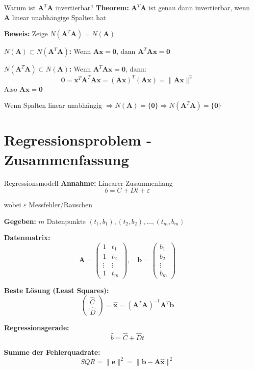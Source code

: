 \documentclass[a4paper, fontsize=7pt]{scrartcl}
\begin{document}
\begin{subbox}{Warum ist $\mathbf{A}^T\mathbf{A}$ invertierbar?}
\textbf{Theorem:} $\mathbf{A}^T\mathbf{A}$ ist genau dann invertierbar, wenn $\mathbf{A}$ linear unabhängige Spalten hat

\textbf{Beweis:} Zeige $N(\mathbf{A}^T\mathbf{A}) = N(\mathbf{A})$

\textbf{$N(\mathbf{A}) \subset N(\mathbf{A}^T\mathbf{A})$:}
Wenn $\mathbf{Ax} = \mathbf{0}$, dann $\mathbf{A}^T\mathbf{Ax} = \mathbf{0}$

\textbf{$N(\mathbf{A}^T\mathbf{A}) \subset N(\mathbf{A})$:}
Wenn $\mathbf{A}^T\mathbf{Ax} = \mathbf{0}$, dann:
$$\mathbf{0} = \mathbf{x}^T\mathbf{A}^T\mathbf{Ax} = (\mathbf{Ax})^T(\mathbf{Ax}) = \|\mathbf{Ax}\|^2$$
Also $\mathbf{Ax} = \mathbf{0}$

Wenn Spalten linear unabhängig $\Rightarrow N(\mathbf{A}) = \{\mathbf{0}\} \Rightarrow N(\mathbf{A}^T\mathbf{A}) = \{\mathbf{0}\}$
\end{subbox}

\section{Regressionsproblem - Zusammenfassung}

\begin{mainbox}{Regressionsmodell}
\textbf{Annahme:} Linearer Zusammenhang
$$b = C + Dt + \varepsilon$$

wobei $\varepsilon$ Messfehler/Rauschen

\textbf{Gegeben:} $m$ Datenpunkte $(t_1, b_1), (t_2, b_2), \ldots, (t_m, b_m)$

\textbf{Datenmatrix:}
$$\mathbf{A} = \begin{pmatrix} 1 & t_1 \\ 1 & t_2 \\ \vdots & \vdots \\ 1 & t_m \end{pmatrix}, \quad \mathbf{b} = \begin{pmatrix} b_1 \\ b_2 \\ \vdots \\ b_m \end{pmatrix}$$

\textbf{Beste Lösung (Least Squares):}
$$\begin{pmatrix} \hat{C} \\ \hat{D} \end{pmatrix} = \hat{\mathbf{x}} = (\mathbf{A}^T\mathbf{A})^{-1}\mathbf{A}^T\mathbf{b}$$

\textbf{Regressionsgerade:}
$$\hat{b} = \hat{C} + \hat{D}t$$

\textbf{Summe der Fehlerquadrate:}
$$SQR = \|\mathbf{e}\|^2 = \|\mathbf{b} - \mathbf{A}\hat{\mathbf{x}}\|^2$$
\end{mainbox}
\end{document}
